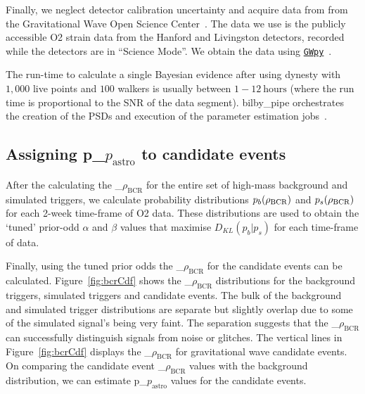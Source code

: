 \documentclass[%
 nofootinbib,
 amsmath,amssymb,
 aps,
 twocolumn
]{revtex4-2}
\newcommand{\bilbypipe}{{\sc bilby\_pipe}\xspace}
\newcommand{\dynesty}{{\sc dynesty}\xspace}
\newcommand{\gwpy}{{\sc \href{https://gwpy.github.io/}{\texttt{GWpy}}}\xspace}
\newcommand{\fancytext}[1]{{\relax\ifmmode#1\else $#1$\fi}\xspace}
\newcommand{\mathcmd}[1]{{\sc \relax\ifmmode#1\else $#1$\fi}\xspace}
\newcommand{\bcr}{\mathcmd{\rho_\text{BCR}}}
\newcommand{\pastro}{\fancytext{p_\text{astro}}}
\begin{document}
Finally, we neglect detector calibration uncertainty and acquire data from from the Gravitational Wave Open Science Center~\cite{GWOSC}. The data we use is the publicly accessible O2 strain data from the Hanford and Livingston detectors, recorded while the detectors are in ``Science Mode''. We obtain the data using \gwpy~\cite{gwpy}. 

The run-time to calculate a single Bayesian evidence after using \dynesty with $1,000$ live points and $100$ walkers is usually between $1-12\ \text{hours}$ (where the run time is proportional to the SNR of the data segment). \bilbypipe orchestrates the creation of the PSDs and execution of the parameter estimation jobs~\cite{bilby_pipe}.

\subsection{Assigning \pastro to candidate events}
After the calculating the \bcr for the entire set of high-mass background and simulated triggers, we calculate probability distributions $p_b(\bcr)$ and $p_s(\bcr)$ for each 2-week time-frame of O2 data. These distributions are used to obtain the `tuned' prior-odd $\alpha$ and $\beta$ values that maximise $D_{KL}(p_b|p_s)$ for each time-frame of data.

Finally, using the tuned prior odds the \bcr for the candidate events can be calculated. Figure~\ref{fig:bcrCdf} shows the \bcr distributions for the background triggers, simulated triggers and candidate events. The bulk of the background and simulated trigger distributions are separate but slightly overlap due to some of the simulated signal's being very faint. The separation suggests that the \bcr can successfully distinguish signals from noise or glitches. The vertical lines in Figure~\ref{fig:bcrCdf} displays the \bcr for gravitational wave candidate events. On comparing the candidate event \bcr values with the background distribution, we can estimate \pastro values for the candidate events. 
\end{document}
